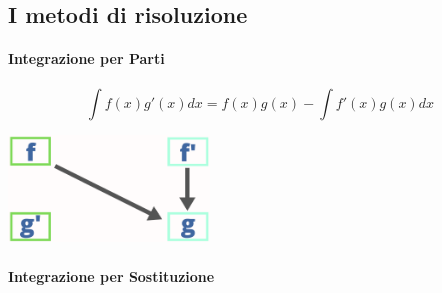 \documentclass[12pt, a4paper]{article}
\begin{document}
\subsection*{I metodi di risoluzione}
\paragraph*{Integrazione per Parti}
$$\int f(x)g'(x)dx = f(x)g(x)-\int f'(x)g(x)dx$$
\begin{center}
	\includegraphics[width=0.4\textwidth]{integrazione-per-parti.png}
\end{center}

\paragraph*{Integrazione per Sostituzione}
\end{document}
